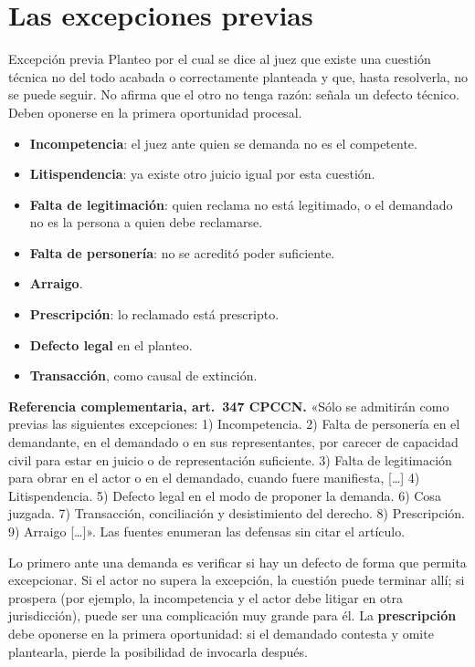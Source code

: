\documentclass[12pt,oneside]{book}
\begin{document}
\section{Las excepciones previas}

\begin{definicion}{Excepción previa}
Planteo por el cual se dice al juez que existe una cuestión técnica no del todo acabada o correctamente planteada y que, hasta resolverla, no se puede seguir. No afirma que el otro no tenga razón: señala un defecto técnico. Deben oponerse en la primera oportunidad procesal.
\end{definicion}

\begin{itemize}
\item \textbf{Incompetencia}: el juez ante quien se demanda no es el competente.
\item \textbf{Litispendencia}: ya existe otro juicio igual por esta cuestión.
\item \textbf{Falta de legitimación}: quien reclama no está legitimado, o el demandado no es la persona a quien debe reclamarse.
\item \textbf{Falta de personería}: no se acreditó poder suficiente.
\item \textbf{Arraigo}.
\item \textbf{Prescripción}: lo reclamado está prescripto.
\item \textbf{Defecto legal} en el planteo.
\item \textbf{Transacción}, como causal de extinción.
\end{itemize}

\begin{nota}
\textbf{Referencia complementaria, art.~347 CPCCN.}
«Sólo se admitirán como previas las siguientes excepciones: 1) Incompetencia. 2) Falta de personería en el demandante, en el demandado o en sus representantes, por carecer de capacidad civil para estar en juicio o de representación suficiente. 3) Falta de legitimación para obrar en el actor o en el demandado, cuando fuere manifiesta, [\ldots] 4) Litispendencia. 5) Defecto legal en el modo de proponer la demanda. 6) Cosa juzgada. 7) Transacción, conciliación y desistimiento del derecho. 8) Prescripción. 9) Arraigo [\ldots]». Las fuentes enumeran las defensas sin citar el artículo.
\end{nota}

Lo primero ante una demanda es verificar si hay un defecto de forma que permita excepcionar. Si el actor no supera la excepción, la cuestión puede terminar allí; si prospera (por ejemplo, la incompetencia y el actor debe litigar en otra jurisdicción), puede ser una complicación muy grande para él. La \textbf{prescripción} debe oponerse en la primera oportunidad: si el demandado contesta y omite plantearla, pierde la posibilidad de invocarla después.
\end{document}
